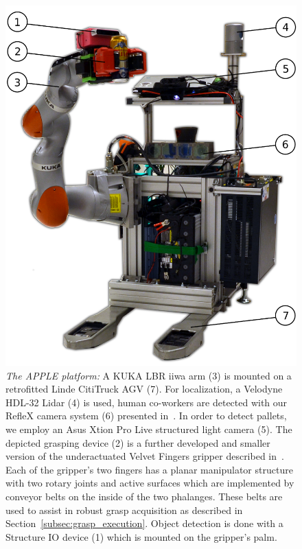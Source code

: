 \begin{figure}[t!]
\begin{center}
\includegraphics[width =0.8\linewidth]{figs/apple_demonstrator}
\caption{\textit{The APPLE platform:} A KUKA LBR iiwa arm (3) is mounted on a retrofitted Linde
  CitiTruck AGV (7). For localization, a Velodyne HDL-32 Lidar (4) is used, human co-workers are
  detected with our RefleX camera system (6) presented in~\cite{Mosb14}. In order to detect pallets,
  we employ an Asus Xtion Pro Live structured light camera (5). The depicted grasping device (2) is
  a further developed and smaller version of the underactuated Velvet Fingers gripper described
  in~\cite{Tinc12}. Each of the gripper’s two fingers has a planar manipulator structure with two
  rotary joints and active surfaces which are implemented by conveyor belts on the inside of the two
  phalanges. These belts are used to assist in robust grasp acquisition as described in
  \mbox{Section~\ref{subsec:grasp_execution}}. Object detection is done with a Structure IO device
  (1) which is mounted on the gripper's palm.}
\label{fig:robot}
\vspace{-0.65cm}
\end{center}
\end{figure}

